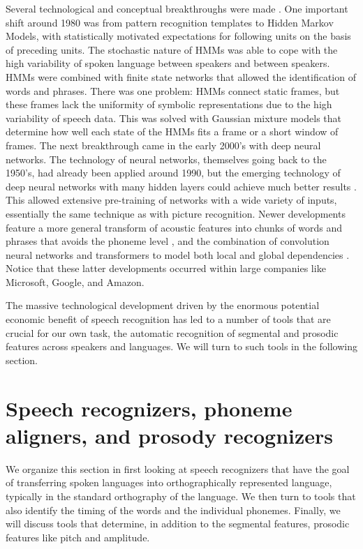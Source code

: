 Several technological and conceptual breakthroughs were made \cite{juang2005}. One important shift around 1980 was from pattern recognition templates to Hidden Markov Models, with statistically motivated expectations for following units on the basis of preceding units. The stochastic nature of HMMs was able to cope with the high variability of spoken language between speakers and between speakers. HMMs were combined with finite state networks that allowed the identification of words and phrases. There was one problem: HMMs connect static frames, but these frames lack the uniformity of symbolic representations due to the high variability of speech data. This was solved with Gaussian mixture models that determine how well each state of the HMMs fits a frame or a short window of frames. The next breakthrough came in the early 2000's with deep neural networks. The technology of neural networks, themselves going back to the 1950's, had already been applied around 1990, but the emerging technology of deep neural networks with many hidden layers could achieve much better results \cite{hinton2012}. This allowed extensive pre-training of networks with a wide variety of inputs, essentially the same technique as with picture recognition. Newer developments feature a more general transform of acoustic features into chunks of words and phrases that avoids the phoneme level \cite{chan2015},  and the combination of convolution neural networks and transformers to model both local and global dependencies \cite{gulati2020}. Notice that these latter developments occurred within large companies like Microsoft, Google, and Amazon.

The massive technological development driven by the enormous potential economic benefit of speech recognition has led to a number of tools that are crucial for our own task, the automatic recognition of segmental and prosodic features across speakers and languages. We will turn to such tools in the following section.

\section{Speech recognizers, phoneme aligners, and prosody recognizers}

We organize this section in first looking at speech recognizers that have the goal of transferring spoken languages into orthographically represented language, typically in the standard orthography of the language. We then turn to tools that also identify the timing of the words and the individual phonemes. Finally, we will discuss tools that determine, in addition to the segmental features, prosodic features like pitch and amplitude. 

